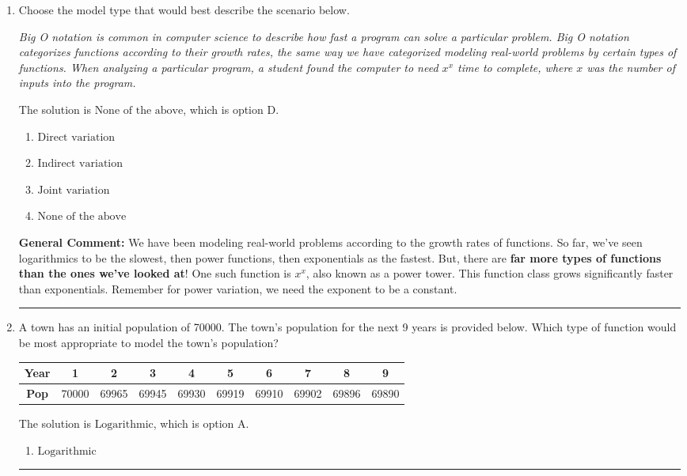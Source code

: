 \documentclass{extbook}[14pt]
\newcommand{\litem}[1]{\item #1

\rule{\textwidth}{0.4pt}}
\begin{document}
\begin{enumerate}\litem{
Choose the model type that would best describe the scenario below.

\begin{center}
    \textit{ Big O notation is common in computer science to describe how fast a program can solve a particular problem. Big O notation categorizes functions according to their growth rates, the same way we have categorized modeling real-world problems by certain types of functions. When analyzing a particular program, a student found the computer to need $x^x$ time to complete, where $x$ was the number of inputs into the program. }
\end{center}
The solution is \( \text{None of the above} \), which is option D.\begin{enumerate}[label=\Alph*.]
\item \( \text{Direct variation} \)


\item \( \text{Indirect variation} \)


\item \( \text{Joint variation} \)


\item \( \text{None of the above} \)


\end{enumerate}

\textbf{General Comment:} We have been modeling real-world problems according to the growth rates of functions. So far, we've seen logarithmics to be the slowest, then power functions, then exponentials as the fastest. But, there are \textbf{far more types of functions than the ones we've looked at}! One such function is $x^x$, also known as a power tower. This function class grows significantly faster than exponentials. Remember for power variation, we need the exponent to be a constant.
}
\litem{
A town has an initial population of 70000. The town's population for the next 9 years is provided below. Which type of function would be most appropriate to model the town's population?


\begin{tabular}{c|c|c|c|c|c|c|c|c|c}
\textbf{Year} &1 &2 &3 &4 &5 &6 &7 &8 &9\tabularnewline \hline
\textbf{Pop} &70000 &69965 &69945 &69930 &69919 &69910 &69902 &69896 &69890\end{tabular}The solution is \( \text{Logarithmic} \), which is option A.\begin{enumerate}[label=\Alph*.]
\item \( \text{Logarithmic} \)


\end{enumerate}}
\end{enumerate}
\end{document}
